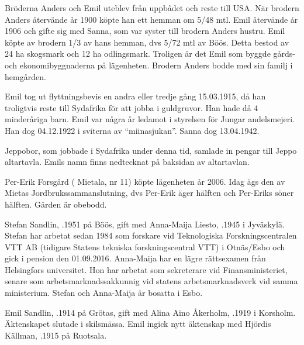 Bröderna Anders och Emil  uteblev från uppbådet och reste till USA. När brodern Anders återvände år 1900 köpte han ett hemman om 5/48 mtl. Emil återvände år 1906 och gifte sig med Sanna, som var syster till brodern Anders hustru. Emil köpte av brodern 1/3 av hans hemman, dvs 5/72 mtl av Böös. Detta bestod av 24 ha skogsmark och 12 ha odlingsmark. Troligen är det Emil som byggde gårds- och ekonomibyggnaderna på lägenheten. Brodern Anders bodde med sin familj i hemgården.

Emil tog ut flyttningsbevis en andra eller tredje gång 15.03.1915, då han troligtvis reste till Sydafrika för att jobba i guldgruvor. Han hade då 4 minderåriga barn. Emil var några år ledamot i styrelsen för Jungar andelsmejeri. Han dog 04.12.1922 i sviterna av ``miinasjukan''. Sanna dog 13.04.1942.

Jeppobor, som jobbade i Sydafrika under denna tid, samlade in pengar till Jeppo altartavla. Emils namn finns nedtecknat på baksidan av altartavlan.



%



%
Per-Erik Forsgård ( Mietala, nr 11) köpte lägenheten år 2006. Idag ägs den av Mietas Jordbrukssammanslutning, dvs Per-Erik äger hälften och Per-Eriks söner hälften. Gården är obebodd.\jhvspace{}


%
Stefan Sandlin, .1951 på Böös, gift med Anna-Maija Liesto, .1945 i Jyväskylä. Stefan har arbetat sedan 1984 som forskare vid Teknologiska Forskningscentralen VTT AB (tidigare Statens tekniska forskningscentral VTT) i Otnäs/Esbo och gick i pension den 01.09.2016. Anna-Maija har en lägre rättsexamen från Helsingfors universitet. Hon har arbetat som sekreterare vid Finansministeriet, senare som arbetsmarknadssakkunnig vid statens arbetsmarknadsverk vid samma ministerium. Stefan och Anna-Maija är bosatta i Esbo.


%
Emil Sandlin, .1914 på Grötas, gift med Alina Aino Åkerholm, .1919 i Korsholm. Äktenskapet slutade i skilsmässa. Emil ingick nytt äktenskap med Hjördis Källman, .1915 på Ruotsala.

